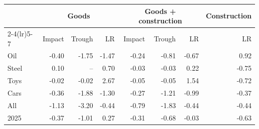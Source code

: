 \begin{tabular}{lrrrrrrr}
\toprule
 & \multicolumn{3}{c}{Goods} & \multicolumn{3}{c}{Goods + construction} & Construction \\
\cmidrule(lr){2-4}\cmidrule(lr){5-7}
 & Impact & Trough & LR & Impact & Trough & LR & LR \\
\midrule
Oil & -0.40 & -1.75 & -1.47 & -0.24 & -0.81 & -0.67 & 0.92 \\
Steel & 0.10 & -- & 0.70 & -0.03 & -0.03 & 0.22 & -0.75 \\
Toys & -0.02 & -0.02 & 2.67 & -0.05 & -0.05 & 1.54 & -0.72 \\
Cars & -0.36 & -1.88 & -1.30 & -0.27 & -1.21 & -0.99 & -0.37 \\
All & -1.13 & -3.20 & -0.44 & -0.79 & -1.83 & -0.44 & -0.44 \\
2025 & -0.37 & -1.01 & 0.27 & -0.31 & -0.68 & -0.03 & -0.63 \\
\bottomrule
\end{tabular}
